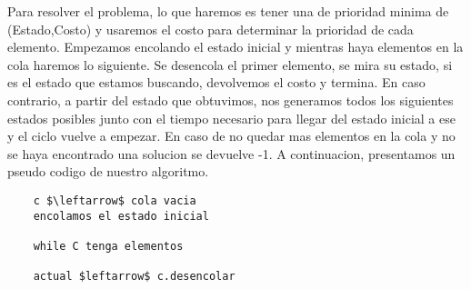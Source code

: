 	Para resolver el problema, lo que haremos es tener una de prioridad minima de  (Estado,Costo) y usaremos el costo para determinar la prioridad de cada elemento.
	Empezamos encolando el estado inicial y mientras haya elementos en la cola haremos lo siguiente.
	Se desencola el primer elemento, se mira su estado, si es el estado que estamos buscando, devolvemos el costo y termina.
	En caso contrario, a partir del estado que obtuvimos, nos generamos todos los siguientes estados posibles junto con el tiempo necesario para llegar del estado inicial a ese y el ciclo vuelve a empezar.
	En caso de no quedar mas elementos en la cola y no se haya encontrado una solucion
	se devuelve -1.
	A continuacion, presentamos un pseudo codigo de nuestro algoritmo.
	

	\lstset{basicstyle=\large}
	\begin{lstlisting}
    c $\leftarrow$ cola vacia
    encolamos el estado inicial

    while C tenga elementos

    actual $leftarrow$ c.desencolar
 		



\end{lstlisting} 